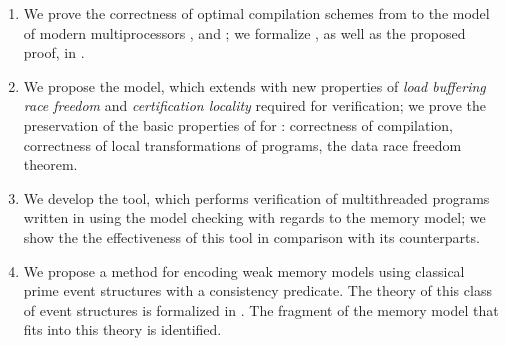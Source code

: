 {}
\begin{enumerate}[beginpenalty=10000] %

\item 
We prove the correctness of optimal compilation schemes from \Wkm 
to the model of modern multiprocessors \TSO, \ARM and \POWER;
we formalize \Wkm, as well as the proposed proof, in \coq.
\item We propose the \WkmS model, which extends \Wkm with
new properties of \emph{load buffering race freedom} 
and \emph{certification locality} required for verification; we prove the preservation of the basic properties of \Wkm for \WkmS: correctness of compilation, correctness of local transformations of programs, the data race freedom theorem.
\item We develop the \wmc tool, which performs verification of multithreaded programs
written in \CLANG using the model checking with regards to the \WkmS memory model; we show the
the effectiveness of this tool in comparison with its counterparts.

\item We propose a method for encoding weak memory models using classical prime event structures with a consistency predicate. The theory of this class of event structures is formalized in \coq. The fragment of the \Wkm memory model that fits into this theory is identified.
\end{enumerate}

